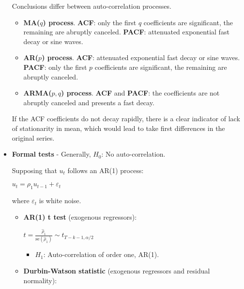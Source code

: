 \documentclass[10pt, a4paper, landscape]{article}
\newcommand{\se}{\mathrm{se}}
\begin{document}
\begin{multicols}{3}
\begin{itemize}[leftmargin=*]
			Conclusions differ between auto-correlation processes.
			
			\columnbreak
			
			\begin{itemize}[leftmargin=*]
				\item \textbf{MA($q$) process}. \textbf{ACF}: only the first $q$ coefficients are significant, the remaining are abruptly canceled. \textbf{PACF}: attenuated exponential fast decay or sine waves.
				\item \textbf{AR($p$) process}. \textbf{ACF}: attenuated exponential fast decay or sine waves. \textbf{PACF}: only the first $p$ coefficients are significant, the remaining are abruptly canceled.
				\item \textbf{ARMA($p, q$) process}. \textbf{ACF} and \textbf{PACF}: the coefficients are not abruptly canceled and presents a fast decay.
			\end{itemize}
			
			If the ACF coefficients do not decay rapidly, there is a clear indicator of lack of stationarity in mean, which would lead to take first differences in the original series.
			
			\item \textbf{Formal tests} - Generally, $H_{0}$: No auto-correlation.
			
			Supposing that $u_{t}$ follows an AR(1) process:
			
			\begin{center}
				$u_{t} = \rho_{1} u_{t - 1} + \varepsilon_{t}$
			\end{center}
			
			where $\varepsilon_{t}$ is white noise.
			
			\begin{itemize}[leftmargin=*]
				\item \textbf{AR(1) t test} (exogenous regressors):
				
				\begin{center}
					$t = \frac{\hat{\rho}_{1}}{\se(\hat{\rho}_{1})} \sim t_{T - k - 1, \alpha/2}$
				\end{center}
				
				\begin{itemize}[leftmargin=*]
					\item $H_{1}$: Auto-correlation of order one, AR(1).
				\end{itemize}
				
				\item \textbf{Durbin-Watson statistic} (exogenous regressors and residual normality):
				

\end{itemize}
\end{itemize}
\end{multicols}
\end{document}
